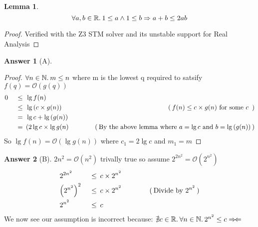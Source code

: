 \documentclass{article}
\newtheorem{lemma}{Lemma}
\theoremstyle{definition}
\newtheorem*{answer}{Answer}
\newcommand{\evidence}[1]{\ensuremath{\hspace{3em} (\hspace{0.2em} \text{#1} \hspace{0.2em})}}
\newcommand{\asymptotic}[3]{\ensuremath{#2 = #1(#3)}}
\newcommand{\bigO}[2]{\asymptotic{\mathcal{O}}{#1}{#2}}
\newcommand{\relation}[1]{\ensuremath{\hspace{0.2em} {{} #1 {}} \hspace{0.2em}}}
\newcommand{\equal}{\relation{=}}
\newcommand{\lesseq}{\relation{\le}}
\newcommand{\parens}[1]{\left(#1\right)}
\newcommand{\quantify}[2]{\ensuremath{\forall #1 \in \mathbb{#2}. \hspace{0.2em}}}
\newcommand{\contra}{\ensuremath{\Rightarrow\!\Leftarrow}}
\begin{document}
\begin{lemma}
  \begin{equation*}
    \quantify{a, b}{R} 1 \le a \wedge 1 \le b \Rightarrow a + b \le 2ab
  \end{equation*}
\end{lemma}

\begin{proof}
  Verified with the Z3 STM solver and its unstable support for Real Analysis \qedhere
\end{proof}


\begin{answer}[A]
  \hfill
  \begin{proof}
    $\quantify{n}{N} m \le n$ where m is the lowest q required to satsify $\bigO{f(q)}{g(q)}$
    \begin{alignat*}{4}
      & 0  & \lesseq & \lg{f(n)}                   & {} \\
      & {} & \lesseq & \lg{\parens{c \times g(n)}} & \evidence{$f(n) \le  c \times g(n)$ for some $c$ } \\
      & {} & \equal  & \lg{c} + \lg{\parens{g(n)}} & {} \\
      & {} & \equal  & (2\lg{c} \times \lg{g(n)}   & \evidence{By the above lemma where $a = \lg{c}$ and $b = \lg{\parens{g(n)}}$}
  \end{alignat*}
  So $\bigO{\lg{f(n)}}{\lg{g(n)}}$ where $c_1 = 2\lg{c}$ and $m_1 = m$ \qedhere
  \end{proof}
  
\end{answer}

\begin{answer}[B]
  $\bigO{2n^2}{n^2}$ trivally true so assume $\bigO{2^{2n^2}}{2^{n^2}}$
  \begin{alignat*}{4}
      & 2^{2n^2}             & \lesseq & c \times 2^{n^2}                    & {} \\
      & {\parens{2^{n^2}}}^2 & \lesseq & c \times 2^{n^2}                    & \evidence{Divide by $2^{n^2}$} \\
      & 2^{n^2}              & \lesseq & c                                  & {}
  \end{alignat*}
  We now see our assumption is incorrect because:
  $\nexists c \in \mathbb{R}. \hspace{0.2em} \quantify{n}{N} 2^{n^2} \le c \hfill \contra$
\end{answer}
\end{document}
